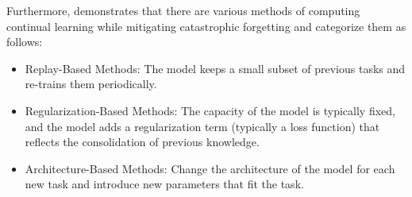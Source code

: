 \documentclass[runningheads]{llncs}
\begin{document}
Furthermore, \cite{Shi24} demonstrates that there are various methods of computing continual learning while mitigating
catastrophic forgetting \cite{Gupta23} and categorize them as follows:
\begin{itemize}
  \item Replay-Based Methods: The model keeps a small subset of previous tasks and re-trains them periodically.
  \item Regularization-Based Methods: The capacity of the model is typically fixed, and the model adds a regularization term (typically a loss function)
that reflects the consolidation of previous knowledge.
  \item Architecture-Based Methods: Change the architecture of the model for each new task and introduce new parameters that fit the task.
\end{itemize}
\end{document}
